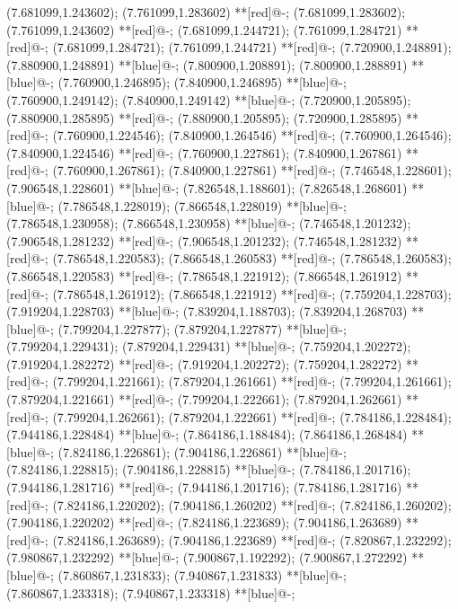 (7.681099,1.243602); (7.761099,1.283602) **[red]@{-};
(7.681099,1.283602); (7.761099,1.243602) **[red]@{-};
(7.681099,1.244721); (7.761099,1.284721) **[red]@{-};
(7.681099,1.284721); (7.761099,1.244721) **[red]@{-};
(7.720900,1.248891); (7.880900,1.248891) **[blue]@{-};
(7.800900,1.208891); (7.800900,1.288891) **[blue]@{-};
(7.760900,1.246895); (7.840900,1.246895) **[blue]@{-};
(7.760900,1.249142); (7.840900,1.249142) **[blue]@{-};
(7.720900,1.205895); (7.880900,1.285895) **[red]@{-};
(7.880900,1.205895); (7.720900,1.285895) **[red]@{-};
(7.760900,1.224546); (7.840900,1.264546) **[red]@{-};
(7.760900,1.264546); (7.840900,1.224546) **[red]@{-};
(7.760900,1.227861); (7.840900,1.267861) **[red]@{-};
(7.760900,1.267861); (7.840900,1.227861) **[red]@{-};
(7.746548,1.228601); (7.906548,1.228601) **[blue]@{-};
(7.826548,1.188601); (7.826548,1.268601) **[blue]@{-};
(7.786548,1.228019); (7.866548,1.228019) **[blue]@{-};
(7.786548,1.230958); (7.866548,1.230958) **[blue]@{-};
(7.746548,1.201232); (7.906548,1.281232) **[red]@{-};
(7.906548,1.201232); (7.746548,1.281232) **[red]@{-};
(7.786548,1.220583); (7.866548,1.260583) **[red]@{-};
(7.786548,1.260583); (7.866548,1.220583) **[red]@{-};
(7.786548,1.221912); (7.866548,1.261912) **[red]@{-};
(7.786548,1.261912); (7.866548,1.221912) **[red]@{-};
(7.759204,1.228703); (7.919204,1.228703) **[blue]@{-};
(7.839204,1.188703); (7.839204,1.268703) **[blue]@{-};
(7.799204,1.227877); (7.879204,1.227877) **[blue]@{-};
(7.799204,1.229431); (7.879204,1.229431) **[blue]@{-};
(7.759204,1.202272); (7.919204,1.282272) **[red]@{-};
(7.919204,1.202272); (7.759204,1.282272) **[red]@{-};
(7.799204,1.221661); (7.879204,1.261661) **[red]@{-};
(7.799204,1.261661); (7.879204,1.221661) **[red]@{-};
(7.799204,1.222661); (7.879204,1.262661) **[red]@{-};
(7.799204,1.262661); (7.879204,1.222661) **[red]@{-};
(7.784186,1.228484); (7.944186,1.228484) **[blue]@{-};
(7.864186,1.188484); (7.864186,1.268484) **[blue]@{-};
(7.824186,1.226861); (7.904186,1.226861) **[blue]@{-};
(7.824186,1.228815); (7.904186,1.228815) **[blue]@{-};
(7.784186,1.201716); (7.944186,1.281716) **[red]@{-};
(7.944186,1.201716); (7.784186,1.281716) **[red]@{-};
(7.824186,1.220202); (7.904186,1.260202) **[red]@{-};
(7.824186,1.260202); (7.904186,1.220202) **[red]@{-};
(7.824186,1.223689); (7.904186,1.263689) **[red]@{-};
(7.824186,1.263689); (7.904186,1.223689) **[red]@{-};
(7.820867,1.232292); (7.980867,1.232292) **[blue]@{-};
(7.900867,1.192292); (7.900867,1.272292) **[blue]@{-};
(7.860867,1.231833); (7.940867,1.231833) **[blue]@{-};
(7.860867,1.233318); (7.940867,1.233318) **[blue]@{-};
